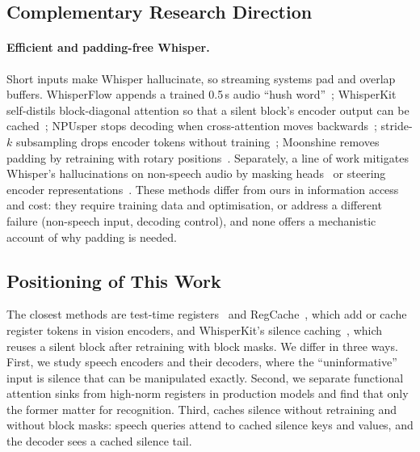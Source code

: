 \subsection{Complementary Research Direction}

\paragraph{Efficient and padding-free Whisper.} Short inputs make Whisper hallucinate, so streaming systems pad and overlap buffers. WhisperFlow appends a trained 0.5\,s audio ``hush word''~\cite{wang2024whisperflow}; WhisperKit self-distils block-diagonal attention so that a silent block's encoder output can be cached~\cite{orhon2025whisperkit}; NPUsper stops decoding when cross-attention moves backwards~\cite{lee2026npusper}; stride-$k$ subsampling drops encoder tokens without training~\cite{cho2026stridek}; Moonshine removes padding by retraining with rotary positions~\cite{jeffries2024moonshine}. Separately, a line of work mitigates Whisper's hallucinations on non-speech audio by masking heads~\cite{wang2025calmwhisper} or steering encoder representations~\cite{aparin2026whispersae}. These methods differ from ours in information access and cost: they require training data and optimisation, or address a different failure (non-speech input, decoding control), and none offers a mechanistic account of why padding is needed.

\subsection{Positioning of This Work}

The closest methods are test-time registers~\cite{jiang2025testtime} and RegCache~\cite{kim2026regcache}, which add or cache register tokens in vision encoders, and WhisperKit's silence caching~\cite{orhon2025whisperkit}, which reuses a silent block after retraining with block masks. We differ in three ways. First, we study speech encoders and their decoders, where the ``uninformative'' input is silence that can be manipulated exactly. Second, we separate functional attention sinks from high-norm registers in production models and find that only the former matter for recognition. Third, \method{} caches silence without retraining and without block masks: speech queries attend to cached silence keys and values, and the decoder sees a cached silence tail.
